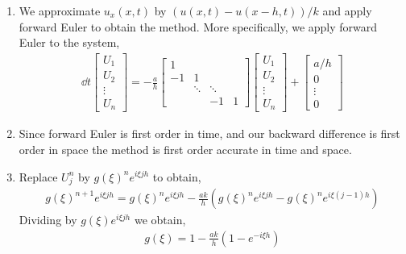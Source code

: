 \documentclass[10pt]{article}
\begin{document}
\begin{solution}[Solution]
\begin{enumerate}[label=(\alph*)]
    \item We approximate \( u_x(x,t) \) by \( (u(x,t) - u(x-h,t)) / k \) and apply forward Euler to obtain the method. More specifically, we apply forward Euler to the system,
        \begin{align*}
            \dd{}{t}\left[\begin{array}{c}U_1\\U_2 \\ \vdots \\ U_n\end{array}\right]
            = -\frac{a}{h}\left[\begin{array}{cccc}
            1 & \\
            -1 & 1 \\
            & \ddots & \ddots \\
            & & -1 & 1\end{array}\right]
            \left[\begin{array}{c}U_1\\U_2 \\ \vdots \\ U_n\end{array}\right]
            +
            \left[\begin{array}{c}a/h \\ 0 \\ \vdots \\ 0\end{array}\right]
        \end{align*}
        
    \item Since forward Euler is first order in time, and our backward difference is first order in space the method is first order accurate in time and space. 
    \item Replace \( U_j^n \) by \( g(\xi)^n e^{i\xi j h} \) to obtain,
        \begin{align*}
            g(\xi)^{n+1} e^{i\xi j h} = g(\xi)^n e^{i\xi j h} - \frac{ak}{h} \left(g(\xi)^n e^{i\xi j h} - g(\xi)^n e^{i\xi (j-1)h}\right)
        \end{align*}
        Dividing by \( g(\xi) e^{i\xi j h} \) we obtain,
        \begin{align*}
            g(\xi) = 1 - \frac{ak}{h}\left(1-e^{-i\xi h} \right)
        \end{align*}
        

\end{enumerate}
\end{solution}
\end{document}
